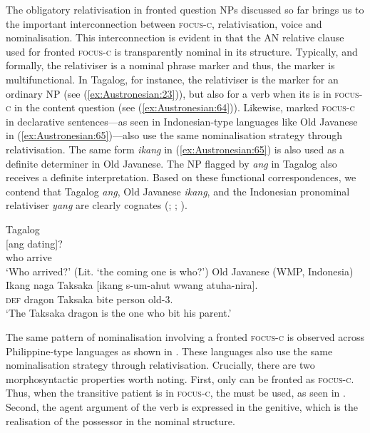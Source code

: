 \documentclass[output=paper,chinesefont]{../langscibook}
\begin{document}
The obligatory relativisation in fronted question NPs discussed so far brings us to the important interconnection between \textsc{focus-c}, relativisation, voice and nominalisation. This interconnection is evident in that the AN relative clause used for fronted \textsc{focus-c} is transparently nominal in its structure. Typically, and formally, the relativiser is a nominal phrase marker and thus, the marker is multifunctional. In Tagalog, for instance, the relativiser is the \NOM marker for an ordinary NP (see (\ref{ex:Austronesian:23})), but also for a verb when its \SUBJ is in \textsc{focus-c} in the content question (see (\ref{ex:Austronesian:64})). Likewise, marked \textsc{focus-c} in declarative sentences—as seen in Indonesian-type languages like Old Javanese in (\ref{ex:Austronesian:65})—also use the same nominalisation strategy through relativisation. The same form \emph{ikang} in (\ref{ex:Austronesian:65}) is also used as a definite determiner in Old Javanese. The NP flagged by \emph{ang} in Tagalog also receives a definite interpretation. Based on these functional correspondences, we contend that Tagalog \emph{ang}, Old Javanese \emph{ikang}, and the Indonesian pronominal relativiser \emph{yang} are clearly cognates (\citealt[266--267]{Kahler1974}; \citealt[465]{Blust2015}; \citealt[228--229]{Kaufman2018}).

\ea\label{ex:Austronesian:64} Tagalog  \citep[219]{Kaufman2018}\\\gll
[Sino]\textsubscript{\PRED} [ang dating]\textsubscript{\SUBJ}? \\
 \phantom{[}who \phantom{[}{\NOM} \textlangle\AV{\textrangle}arrive\\
\glt`Who arrived?' (Lit. `the coming one is who?')
\z
\ea\label{ex:Austronesian:65} Old Javanese (WMP, Indonesia)  \citep[150]{Erawati2014}\\\gll
Ikang naga Taksaka [ikang s-um-ahut wwang atuha-nira]. \\
\textsc{def} dragon Taksaka {\REL} \textlangle{\AV}{\textrangle}bite person old-3\SG.\POSS\\
\glt`The Taksaka dragon is the one who bit his parent.'
\z

\begin{sloppypar}
\noindent
The same pattern of nominalisation involving a fronted \textsc{focus-c} is observed across Philippine-type languages as shown in . These languages also use the same nominalisation strategy through relativisation. Crucially, there are two morphosyntactic properties worth noting. First, only \SUBJ can be fronted as \textsc{focus-c}. Thus, when the transitive patient is in \textsc{focus-c}, the \PV must be used, as seen in . Second, the agent argument of the \PV verb is expressed in the genitive, which is the realisation of the possessor in the nominal structure.
\end{sloppypar}
\end{document}
